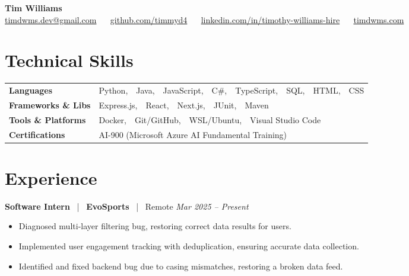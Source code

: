 \documentclass[10pt, letterpaper]{article}
\newcommand{\jobhead}[4]{%
  \vspace{5pt}%
  {\bfseries\color{dark}#1}%
  ~{\color{light}|}~%
  {\bfseries\color{navy}#2}%
  ~{\color{light}|}~%
  {\color{light}#3}%
  \hfill{\color{light}\small\textit{#4}}\\[-2pt]%
}
\newcommand{\skillrow}[2]{%
  {\bfseries #1} & #2 \\[2pt]%
}
\begin{document}

\begin{center}
  {\huge\bfseries\color{navy} Tim Williams}\\[4pt]
  {\small\color{light}
    \href{mailto:timdwms.dev@gmail.com}{timdwms.dev@gmail.com}
    ~\textbullet~
    \href{https://github.com/timmyd4}{github.com/timmyd4}
    ~\textbullet~
    \href{https://www.linkedin.com/in/timothy-williams-hire}{linkedin.com/in/timothy-williams-hire}
    ~\textbullet~
    \href{https://timdwms.com}{timdwms.com}
  }
\end{center}

\vspace{2pt}

\section{Technical Skills}

\begin{tabular}{@{}p{1.6in} p{5.2in}@{}}
  \skillrow{Languages}{Python,\ \ Java,\ \ JavaScript,\ \ C\#,\ \ TypeScript,\ \ SQL,\ \ HTML,\ \ CSS}
  \skillrow{Frameworks \& Libs}{Express.js,\ \ React,\ \ Next.js,\ \ JUnit,\ \ Maven}
  \skillrow{Tools \& Platforms}{Docker,\ \ Git/GitHub,\ \ WSL/Ubuntu,\ \ Visual Studio Code}
  \skillrow{Certifications}{AI-900 (Microsoft Azure AI Fundamental Training)}
\end{tabular}

\section{Experience}

\jobhead{Software Intern}{EvoSports}{Remote}{Mar 2025 – Present}
\begin{itemize}
  \item Diagnosed multi-layer filtering bug, restoring correct data results for users.
  \item Implemented user engagement tracking with deduplication, ensuring accurate data collection.
  \item Identified and fixed backend bug due to casing mismatches, restoring a broken data feed.
\end{itemize}
\end{document}
